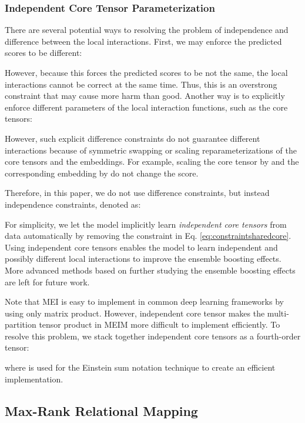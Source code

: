 \documentclass{article}
\theoremstyle{plain}
\theoremstyle{remark}
\begin{document}
\subsubsection{Independent Core Tensor Parameterization}
There are several potential ways to resolving the problem of independence and difference between the local interactions. First, we may enforce the predicted scores to be different:

However, because this forces the predicted scores to be not the same, the local interactions cannot be correct at the same time. Thus, this is an overstrong constraint that may cause more harm than good. Another way is to explicitly enforce different parameters of the local interaction functions, such as the core tensors:

However, such explicit difference constraints do not guarantee different interactions because of symmetric swapping or scaling reparameterizations of the core tensors and the embeddings. For example, scaling the core tensor by  and the corresponding embedding by  do not change the score. 

Therefore, in this paper, we do not use difference constraints, but instead independence constraints, denoted as:

For simplicity, we let the model implicitly learn \textit{independent core tensors} from data automatically by removing the constraint in Eq. \ref{eq:constraintsharedcore}. Using independent core tensors enables the model to learn independent and possibly different local interactions to improve the ensemble boosting effects. More advanced methods based on further studying the ensemble boosting effects are left for future work. 

Note that MEI is easy to implement in common deep learning frameworks by using only matrix product. However, independent core tensor makes the multi-partition tensor product in MEIM more difficult to implement efficiently. To resolve this problem, we stack together  independent core tensors as a fourth-order tensor:

where  is used for the Einstein sum notation technique to create an efficient implementation. 

\subsection{Max-Rank Relational Mapping} \label{sect:model_mapping} 
\end{document}
